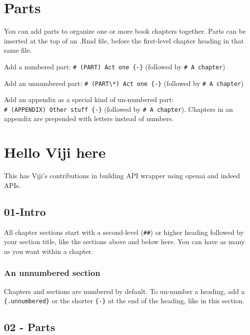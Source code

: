 \documentclass[
]{book}
\begin{document}
\hypertarget{parts}{%
\chapter{Parts}\label{parts}}

You can add parts to organize one or more book chapters together. Parts can be inserted at the top of an .Rmd file, before the first-level chapter heading in that same file.

Add a numbered part: \texttt{\#\ (PART)\ Act\ one\ \{-\}} (followed by \texttt{\#\ A\ chapter})

Add an unnumbered part: \texttt{\#\ (PART\textbackslash{}*)\ Act\ one\ \{-\}} (followed by \texttt{\#\ A\ chapter})

Add an appendix as a special kind of un-numbered part: \texttt{\#\ (APPENDIX)\ Other\ stuff\ \{-\}} (followed by \texttt{\#\ A\ chapter}). Chapters in an appendix are prepended with letters instead of numbers.

\hypertarget{hello-viji-here}{%
\chapter{Hello Viji here}\label{hello-viji-here}}

This has Viji's contributions in building API wrapper using openai and
indeed APIs.

\hypertarget{intro}{%
\section{01-Intro}\label{intro}}

All chapter sections start with a second-level (\texttt{\#\#}) or higher heading followed by your section title, like the sections above and below here. You can have as many as you want within a chapter.

\hypertarget{an-unnumbered-section-1}{%
\subsection*{An unnumbered section}\label{an-unnumbered-section-1}}

Chapters and sections are numbered by default. To un-number a heading, add a \texttt{\{.unnumbered\}} or the shorter \texttt{\{-\}} at the end of the heading, like in this section.

\hypertarget{parts-1}{%
\section{02 - Parts}\label{parts-1}}
\end{document}
